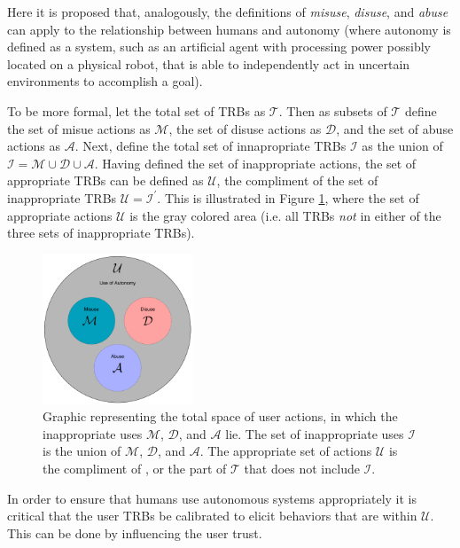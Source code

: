     Here it is proposed that, analogously, the definitions of \emph{misuse}, \emph{disuse}, and \emph{abuse} can apply to the relationship between humans and autonomy (where autonomy is defined as a system, such as an artificial agent with processing power possibly located on a physical robot, that is able to independently act in uncertain environments to accomplish a goal).
    
    To be more formal, let the total set of TRBs as $\mathcal{T}$. Then as subsets of $\mathcal{T}$ define the set of misue actions as $\mathcal{M}$, the set of disuse actions as $\mathcal{D}$, and the set of abuse actions as $\mathcal{A}$. Next, define the total set of innapropriate TRBs $\mathcal{I}$ as the union of $\mathcal{I} = \mathcal{M}\cup \mathcal{D}\cup\mathcal{A}$. Having defined the set of inappropriate actions, the set of appropriate TRBs can be defined as $\mathcal{U}$, the compliment of the set of inappropriate TRBs $\mathcal{U} = \mathcal{I}^\prime$. This is illustrated in Figure \ref{fig:appropriate_use}, where the set of appropriate actions $\mathcal{U}$ is the gray colored area (i.e. all TRBs \emph{not} in either of the three sets of inappropriate TRBs).
    
	\begin{figure}[htbp]
    	\centering
     	\includegraphics[width=0.4\textwidth]{Figures/misuse_disuse_abuse}
    	\caption{Graphic representing the total space of user actions, in which the inappropriate uses $\mathcal{M}$, $\mathcal{D}$, and $\mathcal{A}$ lie. The set of inappropriate uses $\mathcal{I}$ is the union of $\mathcal{M}$, $\mathcal{D}$, and $\mathcal{A}$. The appropriate set of actions $\mathcal{U}$ is the compliment of , or the part of $\mathcal{T}$ that does not include $\mathcal{I}$.}
        \label{fig:appropriate_use}
    \end{figure}
    
    In order to ensure that humans use autonomous systems appropriately it is critical that the user TRBs be calibrated to elicit behaviors that are within $\mathcal{U}$. This can be done by influencing the user trust.

